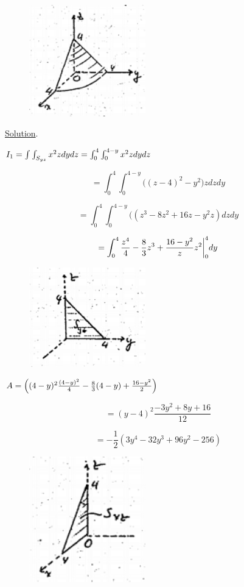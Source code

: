 \documentclass[11pt]{amsbook}
\begin{document}
\begin{figure}
\includegraphics[width=0.45\textwidth]{images/b2p2-413-fig01}
\end{figure}


\underline{Solution}.

$\\I_1=\int \int_{S_{yz}}^{} x^2z dydz=\int_{0}^{4}\int_{0}^{4-y} x^2z dydz$

\[
	= \int_{0}^{4}\int_{0}^{4-y} \Big( (z-4)^2-y^2 \Big)z dzdy
\]

\[
	= \int_{0}^{4}\int_{0}^{4-y} ( (z^3-8z^2+16z-y^2z )dzdy
\]

\[
	= \int_{0}^{4} \frac{z^4}{4} -\frac{8}{3}z^3 + \frac{16-y^2}{z} z^2
	\bigg|_0^4
	dy\\
\]

\begin{figure}
\includegraphics[width=0.45\textwidth]{images/b2p2-413-fig02}
\end{figure}

$\\A=\Big( (4-y)^2 \frac{(4-y)^2}{4} - \frac{8}{3} (4-y) + \frac{16-y^2}{2} \Big)$

\[
	= (y-4)^2 \frac{-3y^2+8y+16}{12}
\]

\[
	= - \frac{1}{2} (3y^4-32y^3+96y^2-256)
\] 

\begin{figure}
\includegraphics[width=0.45\textwidth]{images/b2p2-413-fig03}
\end{figure}
\end{document}

